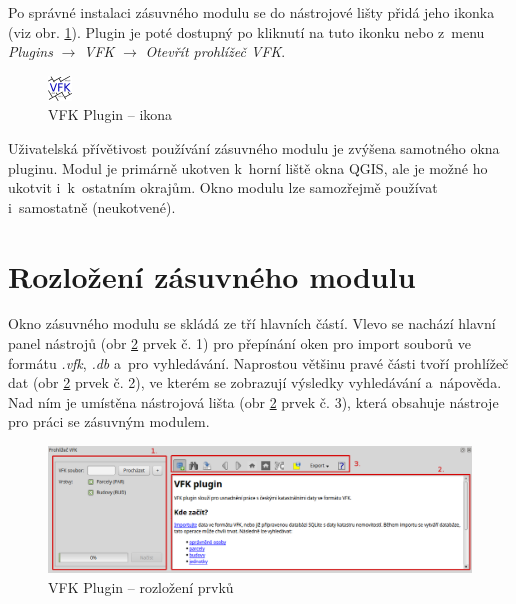 \documentclass[a4paper,12pt,oneside]{book}
\begin{document}
Po správné instalaci zásuvného modulu se do nástrojové lišty přidá
jeho ikonka (viz obr. \ref{l_plugin_ikona}). Plugin je poté dostupný
po kliknutí na tuto ikonku nebo z~menu \textit{Plugins} $\rightarrow$
\textit{VFK} $\rightarrow$ \textit{Otevřít prohlížeč VFK}.

\begin{figure}[H]
\centering
\includegraphics[scale=0.9]{images/vfkPluginIcon.png}
\caption[VFK Plugin -- ikona]{VFK Plugin -- ikona}
\label{l_plugin_ikona}
\end{figure}

Uživatelská přívětivost používání zásuvného modulu je zvýšena
 samotného okna pluginu. Modul je primárně ukotven
k~horní liště okna QGIS, ale je možné ho ukotvit i~k~ostatním
okrajům. Okno modulu lze samozřejmě používat i~samostatně
(neukotvené).

\clearpage
\section{Rozložení zásuvného modulu}
Okno zásuvného modulu se skládá ze tří hlavních částí. Vlevo se
nachází hlavní panel nástrojů (obr \ref{l_plugin_prirucka_rozlozeni}
prvek č. 1) pro přepínání oken pro import souborů ve formátu
\textit{.vfk}, \textit{.db} a~pro vyhledávání. Naprostou většinu pravé
části tvoří prohlížeč dat (obr \ref{l_plugin_prirucka_rozlozeni} prvek
č. 2), ve kterém se zobrazují výsledky vyhledávání a~nápověda. Nad ním
je umístěna nástrojová lišta (obr \ref{l_plugin_prirucka_rozlozeni}
prvek č. 3), která obsahuje nástroje pro práci se zásuvným modulem.

\begin{figure}[H]
\centering
\includegraphics[width=1\textwidth]{images/vfkPlugin-prirucka_rozlozeni.png}
\caption[VFK Plugin -- rozložení prvků]{VFK Plugin -- rozložení prvků}
\label{l_plugin_prirucka_rozlozeni}
\end{figure}
\end{document}

